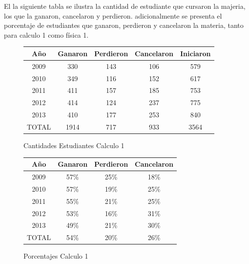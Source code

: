 \documentclass[twoside,letterpaper,11pt]{report}
\begin{document}
El la siguiente tabla se ilustra la cantidad de estudiante que cursaron la majeria, los que la ganaron, cancelaron y perdieron. adicionalmente se presenta el porcentaje de estudiantes que ganaron, perdieron y cancelaron la materia, tanto para calculo 1 como física 1.

\begin{figure}
\begin{center}
\begin{tabular}{|c|c|c|c|c|} \hline
Año		&	Ganaron &	Perdieron 	& Cancelaron 	& 	Iniciaron 	\\ \hline \hline
2009 	&	330 	& 	143 		& 106 			& 	579 		\\ \hline
2010 	&	349 	& 	116 		& 152 			& 	617 		\\ \hline
2011 	&	411 	& 	157 		& 185 			& 	753 		\\ \hline
2012 	&	414 	& 	124 		& 237 			& 	775 		\\ \hline
2013 	&	410 	& 	177 		& 253 			& 	840 		\\ \hline
TOTAL	&	1914	&	717			& 933 			& 	3564 		\\ \hline
\end{tabular}
\end{center}
\caption{Cantidades Estudiantes Calculo 1}
\end{figure}

\begin{figure}
\begin{center}
\begin{tabular}{|c|c|c|c|} \hline
Año		&	Ganaron	&	Perdieron	&	Cancelaron \\ \hline \hline
2009	&	57\%	&	25\%		&	18\% \\ \hline
2010	&	57\%	&	19\%		&	25\% \\ \hline
2011	&	55\%	&	21\%		&	25\% \\ \hline
2012	&	53\%	&	16\%		&	31\% \\ \hline
2013	&	49\%	&	21\%		&	30\% \\ \hline
TOTAL	&	54\%	&	20\%		&	26\% \\ \hline
\end{tabular}
\end{center}
\caption{Porcentajes Calculo 1}
\end{figure}
\end{document}
